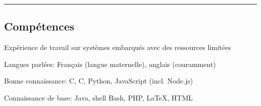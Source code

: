\documentclass[11pt,a4paper]{article}
\newenvironment{indentsection}[1]%
{\begin{list}{}%
	{\setlength{\leftmargin}{#1}}%
	\item[]%
}
{\end{list}}
\newcommand{\Cplusplus}
{C\nolinebreak[4]\hspace{-.05em}\raisebox{.22ex}{\footnotesize\bf ++}}
\begin{document}
\hspace*{\bigskipamount}
\hrule
\subsection*{Compétences}

\begin{indentsection}{\parindent}
\begin{description*}
	\item[Expérience de travail sur systèmes embarqués avec des ressources limitées]
	\item[Langues parlées:]
	Français (langue maternelle), anglais (couramment)
	\item[Bonne connaissance:]
	C, \Cplusplus, Python, JavaScript (incl. Node.js)
	\item[Connaissance de base:]
	Java, shell Bash, PHP, \LaTeX, HTML
\end{description*}
\end{indentsection}
\end{document}
